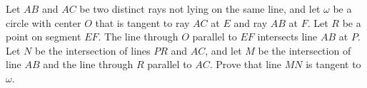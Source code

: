 Let $AB$ and $AC$ be two distinct rays not lying on the same line, and let $\omega$ be a circle with center $O$ that is tangent to ray $AC$ at $E$ and ray $AB$ at $F$. Let $R$ be a point on segment $EF$. The line through $O$ parallel to $EF$ intersects line $AB$ at $P$. Let $N$ be the intersection of lines $PR$ and $AC$, and let $M$ be the intersection of line $AB$ and the line through $R$ parallel to $AC$. Prove that line $MN$ is tangent to $\omega$.